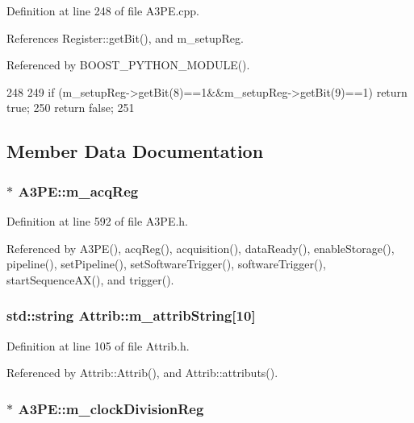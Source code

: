 Definition at line 248 of file A3PE.cpp.

References Register::getBit(), and m\_\-setupReg.

Referenced by BOOST\_\-PYTHON\_\-MODULE().


\begin{DoxyCode}
248                               {
249   if (m_setupReg->getBit(8)==1&&m_setupReg->getBit(9)==1) return true;
250   return false;
251 }
\end{DoxyCode}


\subsection{Member Data Documentation}
\hypertarget{classA3PE_abaf426f4c9192537117b77f9f4821e04}{
\subsubsection[{m\_\-acqReg}]{$\ast$ {\bf A3PE::m\_\-acqReg}}}
\label{classA3PE_abaf426f4c9192537117b77f9f4821e04}


Definition at line 592 of file A3PE.h.

Referenced by A3PE(), acqReg(), acquisition(), dataReady(), enableStorage(), pipeline(), setPipeline(), setSoftwareTrigger(), softwareTrigger(), startSequenceAX(), and trigger().\hypertarget{classAttrib_a3414521d7a82476e874b25a5407b5e63}{
\subsubsection[{m\_\-attribString}]{\setlength{\rightskip}{0pt plus 5cm}std::string {\bf Attrib::m\_\-attribString}\mbox{[}10\mbox{]}}}
\label{classAttrib_a3414521d7a82476e874b25a5407b5e63}


Definition at line 105 of file Attrib.h.

Referenced by Attrib::Attrib(), and Attrib::attributs().\hypertarget{classA3PE_ae1f4c24a99c2e6ae944a080f429cc155}{
\subsubsection[{m\_\-clockDivisionReg}]{$\ast$ {\bf A3PE::m\_\-clockDivisionReg}}}
\label{classA3PE_ae1f4c24a99c2e6ae944a080f429cc155}


